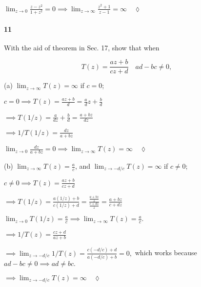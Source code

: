 \documentclass{article}
\begin{document}
$\lim_{z\rightarrow 0} \frac{z-z^2}{1+z^2} = 0 \implies
\lim_{z\rightarrow \infty} \frac{z^2+1}{z-1} = \infty \quad \lozenge$

\newpage
\paragraph{11} With the aid of theorem in Sec. 17, show that when

\[T(z) = \frac{az+b}{cz+d}\quad ad-bc \neq 0,\]

(a) $\lim_{z\rightarrow \infty} T(z) = \infty$ if $c=0$;


$c = 0 \implies T(z) = \frac{az+b}{d} = \frac{a}{d} z +\frac{b}{d}$

$\implies T(1/z) = \frac{a}{dz} +\frac{b}{d} = \frac{a+bz}{dz}$

$\implies 1/T(1/z) = \frac{dz}{a+bz}$

$\lim_{z\rightarrow 0} \frac{dz}{a+bz} = 0 \implies \lim_{z\rightarrow
  \infty} T(z) = \infty \quad \lozenge$

(b) $\lim_{z\rightarrow \infty} T(z) = \frac{a}{c}$, and
$\lim_{z\rightarrow -d/c} T(z) = \infty$ if $c\neq 0$;


$c\neq 0 \implies T(z) = \frac{az+b}{cz+d}$

$\implies T(1/z) = \frac{a(1/z)+b}{c(1/z)+d}
=\frac{\frac{a+bz}{z}}{\frac{c+dz}{z}} = \frac{a+bz}{c+dz}$

$\lim_{z\rightarrow 0} T(1/z) = \frac{a}{c} \implies
\lim_{z\rightarrow \infty} T(z) = \frac{a}{c}.$

$\implies 1/T(z) = \frac{cz+d}{az+b}$

$\implies \lim_{z\rightarrow -d/c} 1/T(z) =
\frac{c(-d/c)+d}{a(-d/c)+b} = 0,$
which works because $ad-bc \neq 0 \implies ad \neq bc.$

$\implies \lim_{z\rightarrow -d/c} T(z) = \infty \quad \lozenge$
\end{document}
